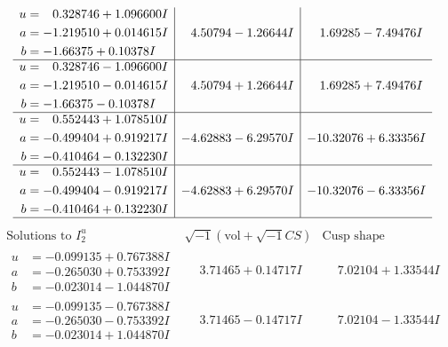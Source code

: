 \documentclass[1p]{elsarticle_modified}
\theoremstyle{definition}
\newcommand{\I}{\sqrt{-1}}
\begin{document}
$$\begin{array}{c|c|c}
\begin{aligned}
u &= \phantom{-}0.328746 + 1.096600 I \\
a &= -1.219510 + 0.014615 I \\
b &= -1.66375 + 0.10378 I\end{aligned}
 & \phantom{-}4.50794 - 1.26644 I & \phantom{-}1.69285 - 7.49476 I \\ \hline\begin{aligned}
u &= \phantom{-}0.328746 - 1.096600 I \\
a &= -1.219510 - 0.014615 I \\
b &= -1.66375 - 0.10378 I\end{aligned}
 & \phantom{-}4.50794 + 1.26644 I & \phantom{-}1.69285 + 7.49476 I \\ \hline\begin{aligned}
u &= \phantom{-}0.552443 + 1.078510 I \\
a &= -0.499404 + 0.919217 I \\
b &= -0.410464 - 0.132230 I\end{aligned}
 & -4.62883 - 6.29570 I & -10.32076 + 6.33356 I \\ \hline\begin{aligned}
u &= \phantom{-}0.552443 - 1.078510 I \\
a &= -0.499404 - 0.919217 I \\
b &= -0.410464 + 0.132230 I\end{aligned}
 & -4.62883 + 6.29570 I & -10.32076 - 6.33356 I\\
 \hline 
 \end{array}$$\newpage$$\begin{array}{c|c|c}  
\text{Solutions to }I^u_{2}& \I (\text{vol} + \sqrt{-1}CS) & \text{Cusp shape}\\
 \hline 
\begin{aligned}
u &= -0.099135 + 0.767388 I \\
a &= -0.265030 + 0.753392 I \\
b &= -0.023014 - 1.044870 I\end{aligned}
 & \phantom{-}3.71465 + 0.14717 I & \phantom{-}7.02104 + 1.33544 I \\ \hline\begin{aligned}
u &= -0.099135 - 0.767388 I \\
a &= -0.265030 - 0.753392 I \\
b &= -0.023014 + 1.044870 I\end{aligned}
 & \phantom{-}3.71465 - 0.14717 I & \phantom{-}7.02104 - 1.33544 I \\ \hline\begin{aligned}

\end{aligned}
\end{array}$$
\end{document}
